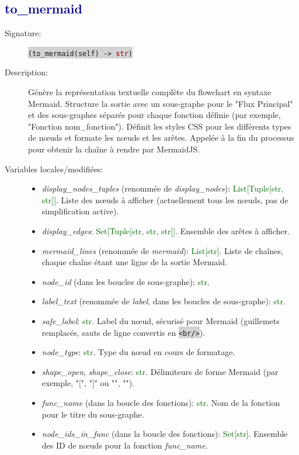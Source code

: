 \documentclass[11pt,a4paper]{article}
\newcommand{\code}[1]{\colorbox{lightgray}{\texttt{\small #1}}}
\newcommand{\var}[1]{\textit{#1}}
\newcommand{\vartype}[1]{\textcolor{darkgreen}{#1}}
\newcommand{\methodname}[1]{\textbf{\textcolor{darkblue}{#1}}}
\newcommand{\rettype}[1]{\textcolor{darkred}{#1}}
\begin{document}
\subsection*{\methodname{to\_mermaid}}
\begin{description}
    \item[Signature:] \code{(to\_mermaid(self) -> \rettype{str})}
    \item[Description:] Génère la représentation textuelle complète du flowchart en syntaxe Mermaid. Structure la sortie avec un sous-graphe pour le "Flux Principal" et des sous-graphes séparés pour chaque fonction définie (par exemple, "Fonction nom\_fonction"). Définit les styles CSS pour les différents types de nœuds et formate les nœuds et les arêtes. Appelée à la fin du processus pour obtenir la chaîne à rendre par MermaidJS.
    \item[Variables locales/modifiées:]
    \begin{itemize}
        \item \var{display\_nodes\_tuples} (renommée de \var{display\_nodes}): \vartype{List[Tuple[str, str]]}. Liste des nœuds à afficher (actuellement tous les nœuds, pas de simplification active).
        \item \var{display\_edges}: \vartype{Set[Tuple[str, str, str]]}. Ensemble des arêtes à afficher.
        \item \var{mermaid\_lines} (renommée de \var{mermaid}): \vartype{List[str]}. Liste de chaînes, chaque chaîne étant une ligne de la sortie Mermaid.
        \item \var{node\_id} (dans les boucles de sous-graphe): \vartype{str}.
        \item \var{label\_text} (renommée de \var{label}, dans les boucles de sous-graphe): \vartype{str}.
        \item \var{safe\_label}: \vartype{str}. Label du nœud, sécurisé pour Mermaid (guillemets remplacés, sauts de ligne convertis en \code{<br/>}).
        \item \var{node\_type}: \vartype{str}. Type du nœud en cours de formatage.
        \item \var{shape\_open}, \var{shape\_close}: \vartype{str}. Délimiteurs de forme Mermaid (par exemple, "[", "]" ou "{", "}").
        \item \var{func\_name} (dans la boucle des fonctions): \vartype{str}. Nom de la fonction pour le titre du sous-graphe.
        \item \var{node\_ids\_in\_func} (dans la boucle des fonctions): \vartype{Set[str]}. Ensemble des ID de nœuds pour la fonction \var{func\_name}.

\end{itemize}
\end{description}
\end{document}
